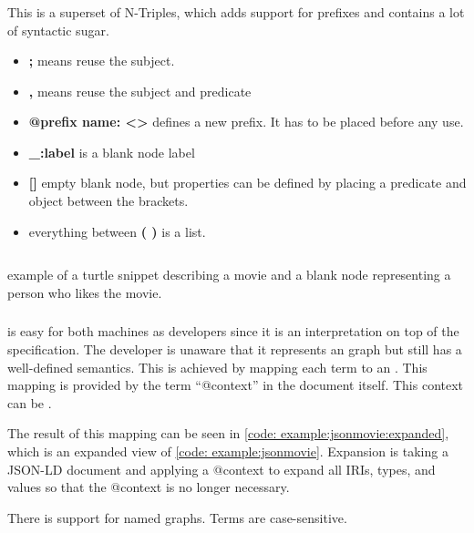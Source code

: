 \subsubsection{}
This is a superset of N-Triples, which adds support for prefixes and contains a lot of syntactic sugar. 
\begin{itemize}

    \item \textbf{;} means reuse the subject.
    \item \textbf{,} means reuse the subject and predicate
    \item \textbf{@prefix name: <>} defines a new prefix. It has to be placed before any use.
    \item \textbf{\_:label} is a blank node label
    \item \textbf{[]} empty blank node, but properties can be defined by placing a predicate and object between the brackets.
    \item everything between \textbf{( )} is a list.
    
\end{itemize}
\begin{listing}[H]
    \inputminted[linenos,frame=single]{Turtle}{code/example_turtle.ttl}
    \caption{example of a turtle snippet describing a movie and a blank node representing a person who likes the movie.}
    \label{code: example:turtle}
\end{listing}
\subsubsection{}
 is easy for both machines as developers since it is an interpretation on top of the  specification. The developer is unaware that it represents an  graph but still has a well-defined semantics. This is achieved by mapping each term to an . This mapping is provided by the term “@context” in the document itself. This context can be . 

The result of this mapping can be seen in \autoref{code: example:jsonmovie:expanded}, which is an expanded view of \autoref{code: example:jsonmovie}. Expansion is taking a JSON-LD document and applying a @context to expand all IRIs, types, and values so that the @context is no longer necessary. 

There is support for named graphs.
Terms are case-sensitive. 


